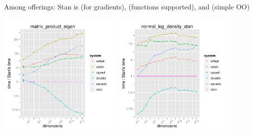 \documentclass[10pt]{report}
\begin{document}
\begin{subitemize}
\item Among  offerings: 
Stan is  (for gradients), 
 (functions supported), 
and  (simple OO)
\end{subitemize}
\vspace*{-8pt}
\hfill
\includegraphics[width=0.45\textwidth]{img/autodiff-eval-matrix-product-eigen.pdf}
\hfill
\includegraphics[width=0.45\textwidth]{img/autodiff-eval-normal-density.pdf}
\hfill


\end{document}
